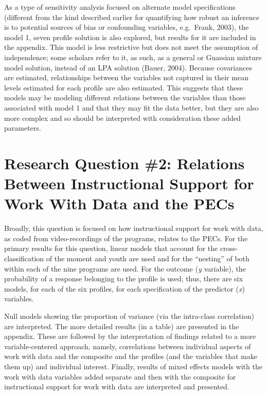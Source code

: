 \documentclass[]{msu-thesis}
\theoremstyle{definition}
\theoremstyle{definition}
\theoremstyle{definition}
\theoremstyle{remark}
\begin{document}
As a type of sensitivity analysis focused on alternate model
specifications (different from the kind described earlier for
quantifying how robust an inference is to potential sources of bias or
confounding variables, e.g.~Frank, 2003), the model 1, seven profile
solution is also explored, but results for it are included in the
appendix. This model is less restrictive but does not meet the
assumption of independence; some scholars refer to it, as such, as a
general or Guassian mixture model solution, instead of an LPA solution
(Bauer, 2004). Because covariances are estimated, relationships between
the variables not captured in their mean levels estimated for each
profile are also estimated. This suggests that these models may be
modeling different relations between the variables than those associated
with model 1 and that they may fit the data better, but they are also
more complex and so should be interpreted with consideration these added
parameters.

\section{Research Question \#2: Relations Between Instructional Support
for Work With Data and the
PECs}\label{research-question-2-relations-between-instructional-support-for-work-with-data-and-the-pecs}

Broadly, this question is focused on how instructional support for work
with data, as coded from video-recordings of the programs, relates to
the PECs. For the primary results for this question, linear models that
account for the cross-classification of the moment and youth are used
and for the ``nesting'' of both within each of the nine programs are
used. For the outcome (\emph{y} variable), the probability of a response
belonging to the profile is used; thus, there are six models, for each
of the six profiles, for each specification of the predictor (\emph{x})
variables.

Null models showing the proportion of variance (via the intra-class
correlation) are interpreted. The more detailed results (in a table) are
presented in the appendix. These are followed by the interpretation of
findings related to a more variable-centered approach, namely,
correlations between individual aspects of work with data and the
composite and the profiles (and the variables that make them up) and
individual interest. Finally, results of mixed effects models with the
work with data variables added separate and then with the composite for
instructional support for work with data are interpreted and presented.
\end{document}
